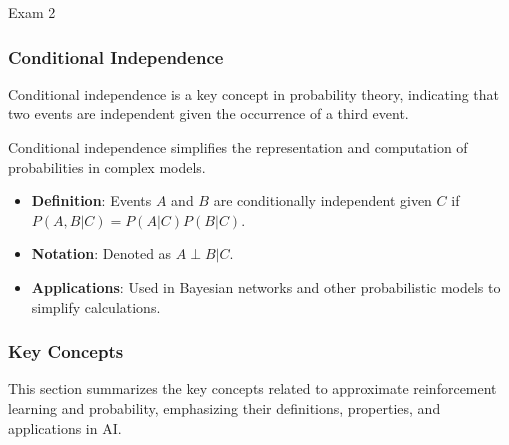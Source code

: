 \begin{examnotes}{Exam 2}
    \subsubsection*{Conditional Independence}
    
    Conditional independence is a key concept in probability theory, indicating that two events are independent given the occurrence of a third event.
    
    \begin{highlight}
        Conditional independence simplifies the representation and computation of probabilities in complex models.
        
        \begin{itemize}
            \item \textbf{Definition}: Events $A$ and $B$ are conditionally independent given $C$ if $P(A, B | C) = P(A | C)P(B | C)$.
            \item \textbf{Notation}: Denoted as $A \perp B | C$.
            \item \textbf{Applications}: Used in Bayesian networks and other probabilistic models to simplify calculations.
        \end{itemize}
    \end{highlight}
    
    \subsubsection*{Key Concepts}
    
    \begin{highlight}
        This section summarizes the key concepts related to approximate reinforcement learning and probability, emphasizing their definitions, properties, and applications in AI.
        

\end{highlight}
\end{examnotes}
